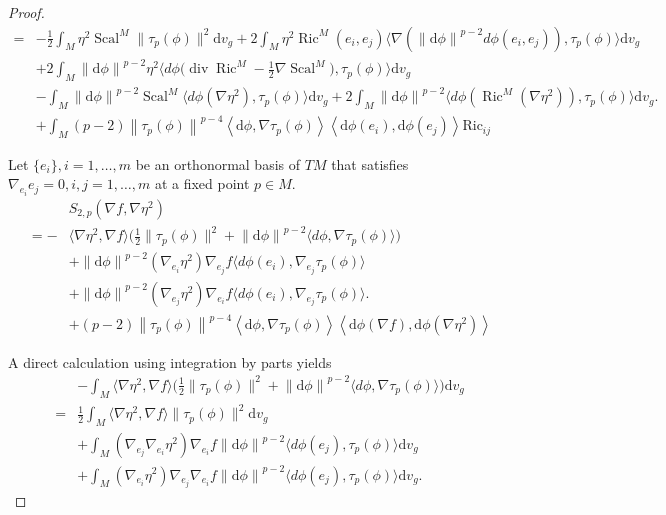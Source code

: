 \documentclass[12pt,UTF8]{article}
\theoremstyle{plain}
\theoremstyle{definition}
\def\d {\mathrm{d}}
\def\Ric {\mathrm{Ric}}
\def\na{\ensuremath{\nabla}}
\renewcommand{\d}[1]{\mathbb{#1}}
\renewcommand{\(}{\left(}
\renewcommand{\)}{\right)}
\newcommand{\norm}[1]{\left\lVert#1\right\rVert}%
\def\Ric{\mathrm{Ric\, }}
\numberwithin{equation}{subsection}
\def\na{\nabla}
\newcommand{\dv}{\operatorname{div}}
\renewcommand{\(}{\left(}
\renewcommand{\)}{\right)}
\def\d{\mathrm{d}}
\def \d {\mathrm{d}}
\def \Ric {\mathrm{Ric}}
\def\dv{\d v_g}
\numberwithin{equation}{section}
\begin{document}
\begin{proof}
\begin{equation}
\begin{split}
		=&-\frac{1}{2}\int_M\eta^2\operatorname{Scal}^M\|\tau_p(\phi)\|^2 \dv
		+2\int_M\eta^2\operatorname{Ric}^M(e_i,e_j)\langle\na \left( \norm{\d \phi}^{p-2}d\phi(e_i,e_j) \right),\tau_p(\phi)\rangle \dv\\
		&+2\int_M\norm{\d \phi}^{p-2}\eta^2\langle d\phi\big(\operatorname{div}\operatorname{Ric}^M-\frac{1}{2}\nabla \operatorname{Scal}^M\big),\tau_p(\phi)\rangle \dv \\
		&-\int_M\norm{\d \phi}^{p-2} \operatorname{Scal}^M
		\langle d\phi(\nabla\eta^2),\tau_p(\phi)\rangle \dv
		+2\int_M\norm{\d \phi}^{p-2}\langle d\phi(\operatorname{Ric}^M(\nabla\eta^2)),\tau_p(\phi)\rangle \dv.\\
		&+\int_M (p-2)\norm{\tau_p(\phi)}^{p-4}\left\langle \d \phi,\na \tau_p(\phi) \right\rangle\left\langle \d \phi(e_i),\d \phi(e_j) \right\rangle\Ric_{ij}
	\end{split}
\end{equation}
	
Let $\{e_i\},i=1,\ldots,m$ be an orthonormal basis of $TM$ that satisfies 
	$\nabla_{e_i}e_j=0,i,j=1,\ldots,m$ at a fixed point $p\in M$.
	\begin{align*}
		&S_{2,p}(\nabla f,\nabla\eta^2)\\
		=-&\langle\nabla\eta^2,\nabla f\rangle\big(\frac{1}{2}\|\tau_p(\phi)\|^2
		+\norm{\d \phi}^{p-2}\langle d\phi,\na\tau_p(\phi)\rangle\big)\\
		&+\norm{\d \phi}^{p-2}(\nabla_{e_i}\eta^2)\nabla_{e_j}f\langle d\phi(e_i),\na_{e_j}\tau_p(\phi)\rangle \\
		&+\norm{\d \phi}^{p-2}(\nabla_{e_j}\eta^2)\nabla_{e_i}f\langle d\phi(e_i),\na_{e_j}\tau_p(\phi)\rangle.\\
		&+(p-2)\norm{\tau_p(\phi)}^{p-4}\left\langle \d \phi,\na \tau_p(\phi) \right\rangle\left\langle \d \phi(\nabla f),\d \phi(\nabla\eta^2) \right\rangle
	\end{align*}
	
	A direct calculation using integration by parts yields
\begin{equation}\label{5}
	\begin{split}
			&-\int_M\langle\nabla\eta^2,\nabla f\rangle\big(\frac{1}{2}\|\tau_p(\phi)\|^2
		+\norm{\d \phi}^{p-2}\langle d\phi,\na\tau_p(\phi)\rangle\big) \dv\\
		=&\frac{1}{2}\int_M\langle\nabla\eta^2,\nabla f\rangle\|\tau_p(\phi)\|^2 \dv \\
		&+\int_M(\nabla_{e_j}\nabla_{e_i}\eta^2)\nabla_{e_i}f\norm{\d \phi}^{p-2}\langle d\phi(e_j),\tau_p(\phi)\rangle \dv\\
		&+\int_M(\nabla_{e_i}\eta^2)\nabla_{e_j}\nabla_{e_i}f\norm{\d \phi}^{p-2}\langle d\phi(e_j),\tau_p(\phi)\rangle \dv.
	\end{split}
\end{equation}
	

\end{proof}
\end{document}

